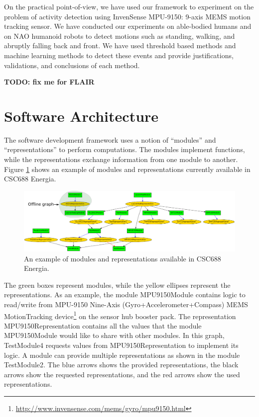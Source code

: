\documentclass[letterpaper]{article}
\begin{document}
On the practical point-of-view, we have used our framework to experiment on the problem of activity
detection using InvenSense MPU-9150: 9-axis MEMS motion tracking sensor. We have conducted our
experiments on able-bodied humans and on NAO humanoid robots to detect motions such as standing,
walking, and abruptly falling back and front. We have used threshold based methods and machine
learning methods to detect these events and provide justifications, validations, and conclusions of
each method.  

\textbf{TODO: fix me for FLAIR}



\section{Software Architecture}

The software development framework uses a notion of ``modules'' and ``representations'' to perform
computations. The modules implement functions, while the representations exchange information from
one module to another. Figure \ref{fig:framework} shows an example of modules and representations
currently available in CSC688 Energia.

\begin{figure}[!t]
\centering
 \includegraphics[width=1.0\textwidth] {figures/framework.pdf}
 \caption{An example of modules and representations available in CSC688 Energia.}
 \label{fig:framework}
\end{figure}

The green boxes represent modules, while the yellow ellipses represent the representations. As an
example, the module {\sf MPU9150Module} contains logic to read/write from MPU-9150 Nine-Axis
(Gyro+Accelerometer+Compass) MEMS MotionTracking
device\footnote{\url{http://www.invensense.com/mems/gyro/mpu9150.html}} on the sensor hub booster
pack. The representation {\sf MPU9150Representation} contains all the values that the module
{\sf MPU9150Module} would like to share with other modules. In this graph, {\sf TestModule4}
requests
values from {\sf MPU9150Representation} to implement its logic. A module can provide multiple
representations as shown in the module {\sf TestModule2}. The blue arrows shows the provided
representations, the black arrows show the requested representations, and the red arrows show the
used representations.
\end{document}
